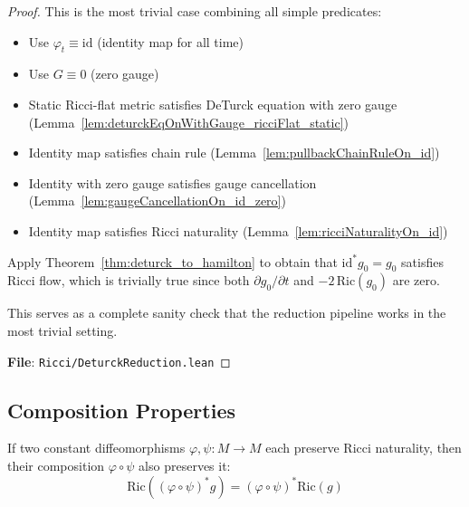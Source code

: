 \begin{proof}
\leanok
{}
This is the most trivial case combining all simple predicates:
\begin{itemize}
\item Use $\varphi_t \equiv \mathrm{id}$ (identity map for all time)
\item Use $G \equiv 0$ (zero gauge)
\item Static Ricci-flat metric satisfies DeTurck equation with zero gauge (Lemma~\ref{lem:deturckEqOnWithGauge_ricciFlat_static})
\item Identity map satisfies chain rule (Lemma~\ref{lem:pullbackChainRuleOn_id})
\item Identity with zero gauge satisfies gauge cancellation (Lemma~\ref{lem:gaugeCancellationOn_id_zero})
\item Identity map satisfies Ricci naturality (Lemma~\ref{lem:ricciNaturalityOn_id})
\end{itemize}
Apply Theorem~\ref{thm:deturck_to_hamilton} to obtain that $\mathrm{id}^* g_0 = g_0$ satisfies Ricci flow, which is trivially true since both $\partial g_0/\partial t$ and $-2\,\mathrm{Ric}(g_0)$ are zero.

This serves as a complete sanity check that the reduction pipeline works in the most trivial setting.

\textbf{File}: \texttt{Ricci/DeturckReduction.lean}
\end{proof}

\subsection{Composition Properties}

\begin{lemma}
\label{lem:ricciNaturalityOn_const_comp}
\leanok
{}
If two constant diffeomorphisms $\varphi, \psi : M \to M$ each preserve Ricci naturality, then their composition $\varphi \circ \psi$ also preserves it:
\[ \mathrm{Ric}((\varphi \circ \psi)^* g) = (\varphi \circ \psi)^* \mathrm{Ric}(g) \]
\end{lemma}

